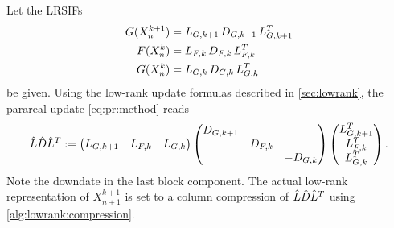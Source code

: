 Let the \acp{LRSIF}
\begin{equation}
\begin{aligned}
  G(X^{k+1}_n) &= \mathop{L_{G,k+1}} \mathop{D_{G,k+1}} \mathop{L_{G,k+1}^T} \\
  F(X^k_n)     &= \mathop{L_{F,k}}   \mathop{D_{F,k}}   \mathop{L_{F,k}^T} \\
  G(X^k_n)     &= \mathop{L_{G,k}}   \mathop{D_{G,k}}   \mathop{L_{G,k}^T}
\end{aligned}
\end{equation}
be given.
Using the low-rank update formulas described in \autoref{sec:lowrank},
the parareal update \eqref{eq:pr:method} reads
\begin{equation}
  \hat L \hat D \hat L^T :=
  \begin{pmatrix}
    L_{G,k+1} &
    L_{F,k} &
    L_{G,k}
  \end{pmatrix}
  \begin{pmatrix}
    D_{G,k+1} \\
    & D_{F,k} \\
    && -D_{G,k}
  \end{pmatrix}
  \begin{pmatrix}
    L_{G,k+1}^T \\
    L_{F,k}^T \\
    L_{G,k}^T
  \end{pmatrix}
  .
\end{equation}
Note the downdate in the last block component.
The actual low-rank representation of $X^{k+1}_{n+1}$ is set to a column compression of $\hat L \hat D \hat L^T$
using \autoref{alg:lowrank:compression}.

